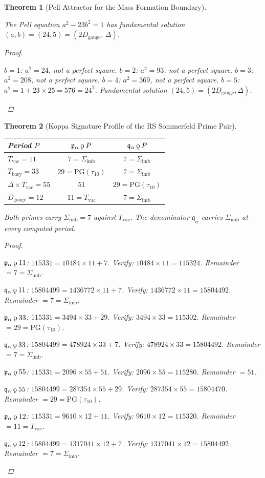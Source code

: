 \documentclass[11pt, letterpaper]{article}
\newcommand{\koppa}{\mathbin{\text{\rm\k{o}}}}
\newcommand{\Tbary}{T_{\mathrm{bary}}}
\newcommand{\Dg}{D_{\mathrm{gauge}}}
\newcommand{\Sigimb}{\Sigma_{\mathrm{imb}}}
\newcommand{\PG}{\mathrm{PG}}
\newcommand{\Tvac}{T_{\mathrm{vac}}}
\newcommand{\tauX}{\tau_{10}}
\newcommand{\pa}{\mathfrak{p}_\alpha}
\newcommand{\qa}{\mathfrak{q}_\alpha}
\theoremstyle{definition}
\theoremstyle{plain}
\newtheorem{theorem}{Theorem}[section]
\begin{document}
\begin{theorem}[Pell Attractor for the Mass Formation Boundary]
\label{thm:pell-23}
\begin{rsbox}
The Pell equation $a^2-23b^2=1$ has fundamental solution
$(a,b)=(24,5)=(2\Dg,\,\Delta)$.
\end{rsbox}
\begin{proof}
\begin{rsbox}
$b=1$: $a^2=24$, not a perfect square.
$b=2$: $a^2=93$, not a perfect square.
$b=3$: $a^2=208$, not a perfect square.
$b=4$: $a^2=369$, not a perfect square.
$b=5$: $a^2=1+23\times25=576=24^2$.
Fundamental solution $(24,5)=(2\Dg,\Delta)$.
\end{rsbox}
\end{proof}
\end{theorem}

\begin{theorem}[Koppa Signature Profile of the RS Sommerfeld Prime Pair]
\label{thm:sommerfeld-koppa}
\begin{rsbox}
\begin{center}
\begin{tabular}{lcc}
\toprule
Period $P$ & $\pa\koppa P$ & $\qa\koppa P$ \\
\midrule
$\Tvac=11$ & $7=\Sigimb$ & $7=\Sigimb$ \\
$\Tbary=33$ & $29=\PG(\tauX)$ & $7=\Sigimb$ \\
$\Delta\times\Tvac=55$ & $51$ & $29=\PG(\tauX)$ \\
$\Dg=12$ & $11=\Tvac$ & $7=\Sigimb$ \\
\bottomrule
\end{tabular}
\end{center}
Both primes carry $\Sigimb=7$ against $\Tvac$.  The denominator $\qa$ carries
$\Sigimb$ at every computed period.
\end{rsbox}
\begin{proof}
\begin{rsbox}
$\pa\koppa11$: $115331=10484\times11+7$.
Verify: $10484\times11=115324$.  Remainder $=7=\Sigimb$.

$\qa\koppa11$: $15804499=1436772\times11+7$.
Verify: $1436772\times11=15804492$.  Remainder $=7=\Sigimb$.

$\pa\koppa33$: $115331=3494\times33+29$.
Verify: $3494\times33=115302$.  Remainder $=29=\PG(\tauX)$.

$\qa\koppa33$: $15804499=478924\times33+7$.
Verify: $478924\times33=15804492$.  Remainder $=7=\Sigimb$.

$\pa\koppa55$: $115331=2096\times55+51$.
Verify: $2096\times55=115280$.  Remainder $=51$.

$\qa\koppa55$: $15804499=287354\times55+29$.
Verify: $287354\times55=15804470$.  Remainder $=29=\PG(\tauX)$.

$\pa\koppa12$: $115331=9610\times12+11$.
Verify: $9610\times12=115320$.  Remainder $=11=\Tvac$.

$\qa\koppa12$: $15804499=1317041\times12+7$.
Verify: $1317041\times12=15804492$.  Remainder $=7=\Sigimb$.
\end{rsbox}
\end{proof}
\end{theorem}
\end{document}
